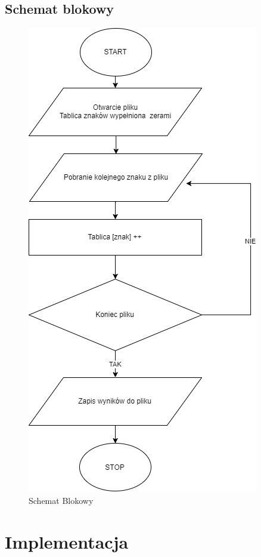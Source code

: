 \documentclass[]{article}
\begin{document}
\subsection{Schemat blokowy}
\begin{figure}[H]
	\centering
	\includegraphics[width=0.5\linewidth]{scheme_diagram}
	\caption{Schemat Blokowy}
	\label{fig:schemeDiagram}
\end{figure}
\section{Implementacja}
\end{document}
